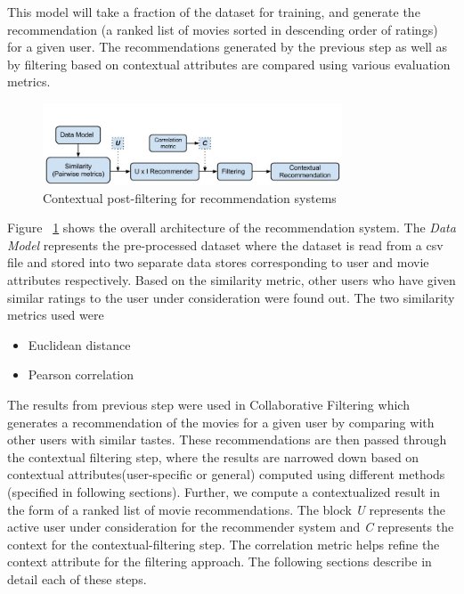 \documentclass{article}
\begin{document}
This model will take a fraction of the dataset for training, and generate the recommendation (a ranked list of movies sorted in descending order of ratings) for a given user. The recommendations generated by the previous step as well as by filtering based on contextual attributes are compared using various evaluation metrics.

\begin{figure}[H]
\centering
\includegraphics[width=3.5in]{archdiagram.jpg}
\caption{Contextual post-filtering for recommendation systems}
\label{archdiag}
\end{figure}

Figure ~\ref{archdiag} shows the overall architecture of the recommendation system. The \textit{Data Model} represents the pre-processed dataset where the dataset is read from a csv file and stored into two separate data stores corresponding to user and movie attributes respectively. Based on the similarity metric, other users who have given similar ratings to the user under consideration were found out.     The two similarity metrics used were

\begin{itemize}
\item Euclidean distance 
\item Pearson correlation
\end{itemize}

The results from previous step were used in Collaborative Filtering which generates a recommendation of the movies for a given user by comparing with other users with similar tastes. These recommendations are then passed through the contextual filtering step, where the results are narrowed down based on contextual attributes(user-specific or general) computed using different methods (specified in following sections). Further, we compute a contextualized result in the form of a ranked list of movie recommendations. The block \textit{U} represents the active user under consideration for the recommender system and \textit{C} represents the context for the contextual-filtering step. The correlation metric helps refine the context attribute for the filtering approach. The following sections describe in detail each of these steps.
\end{document}
